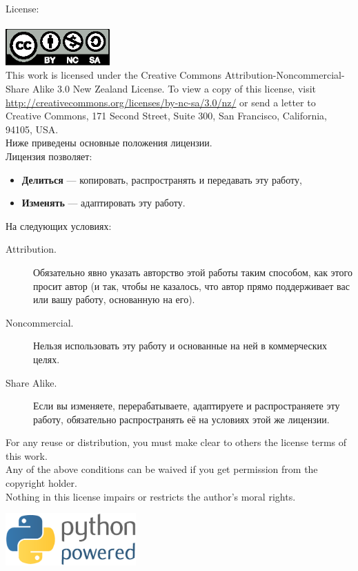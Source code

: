 \noindent
License:\\
\\
\includegraphics[width=40mm]{../en/by-nc-sa.eps}\\
This work is licensed under the Creative Commons Attribution-Noncommercial-Share Alike 3.0 New Zealand License. To view a copy of this license, visit\\ \href{http://creativecommons.org/licenses/by-nc-sa/3.0/nz/}{http://creativecommons.org/licenses/by-nc-sa/3.0/nz/} or send a letter to Creative Commons, 171 Second Street, Suite 300, San Francisco, California, 94105, USA.\\

\noindent
Ниже приведены основные положения лицензии.\\

\noindent
Лицензия позволяет:
\begin{itemize}
 \item \textbf{Делиться} — копировать, распространять и передавать эту работу,
 \item \textbf{Изменять} — адаптировать эту работу.
\end{itemize}
\noindent
На следующих условиях:
\begin{description}
 \item[Attribution.] Обязательно явно указать авторство этой работы таким способом, как этого просит автор (и так, чтобы не казалось, что автор прямо поддерживает вас или вашу работу, основанную на его).
 \item[Noncommercial.] Нельзя использовать эту работу и основанные на ней в коммерческих целях.
 \item[Share Alike.] Если вы изменяете, перерабатываете, адаптируете и распространяете эту работу, обязательно распространять её на условиях этой же лицензии.
\end{description}

\noindent
For any reuse or distribution, you must make clear to others the license terms of this work.\\

\noindent
Any of the above conditions can be waived if you get permission from the copyright holder.\\

\noindent
Nothing in this license impairs or restricts the author's moral rights.\\

\vspace*{4cm}
\begin{center}
\includegraphics[width=5cm]{../en/python-powered.eps}
\end{center}

\mainmatter

\pagestyle{plain}

\tableofcontents

\pagestyle{headings}
